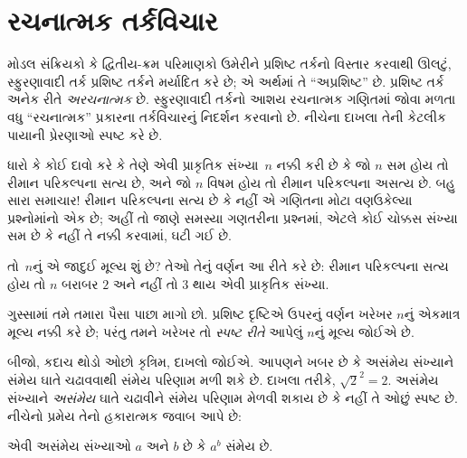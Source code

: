 
\label{guunit:OLP-0491}


\begingroup
\makeatletter{}\makeatother

\label{guunit:OLP-0492}


\begingroup
\makeatletter{}\makeatother


\section{રચનાત્મક તર્કવિચાર}
\label{guunit:OLP-0493}


મોડલ સંક્રિયકો કે દ્વિતીય-ક્રમ પરિમાણકો ઉમેરીને પ્રશિષ્ટ તર્કનો
વિસ્તાર કરવાથી ઊલટું, સ્ફુરણાવાદી તર્ક પ્રશિષ્ટ તર્કને મર્યાદિત
કરે છે; એ અર્થમાં તે ``અપ્રશિષ્ટ'' છે. પ્રશિષ્ટ તર્ક અનેક રીતે
\emph{અરચનાત્મક} છે. સ્ફુરણાવાદી તર્કનો આશય રચનાત્મક ગણિતમાં
જોવા મળતા વધુ ``રચનાત્મક'' પ્રકારના તર્કવિચારનું નિદર્શન કરવાનો
છે. નીચેના દાખલા તેની કેટલીક પાયાની પ્રેરણાઓ સ્પષ્ટ કરે છે.

ધારો કે કોઈ દાવો કરે કે તેણે એવી પ્રાકૃતિક સંખ્યા~$n$ નક્કી
કરી છે કે જો $n$ સમ હોય તો રીમાન પરિકલ્પના સત્ય છે, અને જો
$n$ વિષમ હોય તો રીમાન પરિકલ્પના અસત્ય છે. બહુ સારા સમાચાર!{}
રીમાન પરિકલ્પના સત્ય છે કે નહીં એ ગણિતના મોટા વણઉકેલ્યા
પ્રશ્નોમાંનો એક છે; અહીં તો જાણે સમસ્યા ગણતરીના પ્રશ્નમાં,
એટલે કોઈ ચોક્કસ સંખ્યા સમ છે કે નહીં તે નક્કી કરવામાં, ઘટી
ગઈ છે.

તો~$n$નું એ જાદુઈ મૂલ્ય શું છે? તેઓ તેનું વર્ણન આ રીતે કરે છે:
રીમાન પરિકલ્પના સત્ય હોય તો $n$ બરાબર $2$ અને નહીં તો $3$
થાય એવી પ્રાકૃતિક સંખ્યા.

ગુસ્સામાં તમે તમારા પૈસા પાછા માગો છો. પ્રશિષ્ટ દૃષ્ટિએ ઉપરનું
વર્ણન ખરેખર $n$નું એકમાત્ર મૂલ્ય નક્કી કરે છે; પરંતુ તમને
ખરેખર તો \emph{સ્પષ્ટ રીતે} આપેલું $n$નું મૂલ્ય જોઈએ છે.

બીજો, કદાચ થોડો ઓછો કૃત્રિમ, દાખલો જોઈએ. આપણને ખબર છે કે
અસંમેય સંખ્યાને સંમેય ઘાતે ચઢાવવાથી સંમેય પરિણામ મળી શકે છે.
દાખલા તરીકે, $\sqrt{2}^2 = 2$. અસંમેય સંખ્યાને
\emph{અસંમેય} ઘાતે ચઢાવીને સંમેય પરિણામ મેળવી શકાય છે કે
નહીં તે ઓછું સ્પષ્ટ છે. નીચેનો પ્રમેય તેનો હકારાત્મક જવાબ
આપે છે:

\begin{thm}
એવી અસંમેય સંખ્યાઓ $a$ અને $b$ છે કે $a^b$ સંમેય છે.
\end{thm}

